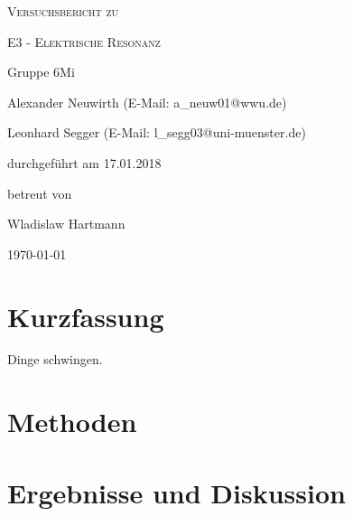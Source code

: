 \documentclass[
	a4paper,
	12pt,
	pagesize,
	ngerman
]{scrartcl}
\begin{document}
	
	\begin{titlepage}
		\centering
		{\scshape\LARGE Versuchsbericht zu \par}
		\vspace{1cm}
		{\scshape\huge E3 - Elektrische Resonanz \par} 
		\vspace{2.5cm}
		{\LARGE Gruppe 6Mi \par}
		\vspace{0.5cm}
		
		{\large Alexander Neuwirth (E-Mail: a\_neuw01@wwu.de) \par}
		{\large Leonhard Segger (E-Mail: l\_segg03@uni-muenster.de) \par}
		\vfill
		
		durchgeführt am 17.01.2018\par
		betreut von\par
		{\large Wladislaw Hartmann} %
		
		\vfill
		
		{\large \today\par}
	\end{titlepage}
	\tableofcontents
	\newpage


	\section{Kurzfassung}
	Dinge schwingen.
	\section{Methoden}
	
	\section{Ergebnisse und Diskussion}
\end{document}
